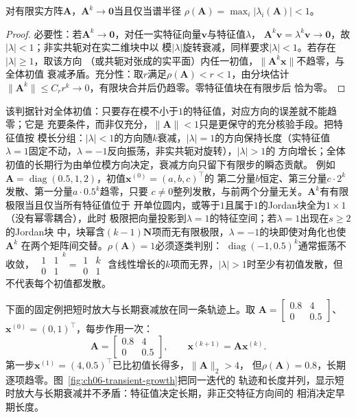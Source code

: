 \begin{theorem}[固定矩阵幂的衰减判据]
\label{thm:ls-power-decay}
对有限实方阵$\bm A$，$\bm A^k\to\bm0$当且仅当谱半径
$\rho(\bm A)=\max_i|\lambda_i(\bm A)|<1$。
\end{theorem}
\begin{proof}
必要性：若$\bm A^k\to\bm0$，对任一实特征向量$\bm v$与特征值$\lambda$，
$\bm A^k\bm v=\lambda^k\bm v\to\bm0$，故$|\lambda|<1$；非实共轭对在实二维块中以
模$|\lambda|$旋转衰减，同样要求$|\lambda|<1$。若存在$|\lambda|\geq1$，取该方向
（或共轭对张成的实平面）内任一初值，$\lVert\bm A^k\bm x\rVert$不趋零，与全体初值
衰减矛盾。充分性：取$r$满足$\rho(\bm A)<r<1$，由分块估计
$\lVert\bm A^k\rVert\leq C_r r^k\to0$，有限块合并后仍趋零。零特征值块在有限步后
恰为零。
\end{proof}
该判据针对全体初值：只要存在模不小于$1$的特征值，对应方向的误差就不能趋零；它是
充要条件，而非仅充分，$\lVert\bm A\rVert<1$只是更保守的充分核验手段。把特征值按
模长分组：$|\lambda|<1$的方向随$k$衰减，$|\lambda|=1$的方向保持长度（实特征值
$\lambda=1$固定不动，$\lambda=-1$反向振荡，非实共轭对旋转），$|\lambda|>1$的
方向增长；全体初值的长期行为由单位模方向决定，衰减方向只留下有限步的瞬态贡献。
例如$\bm A=\operatorname{diag}(0.5,1,2)$，初值$\bm x^{(0)}=(a,b,c)^{\top}$的
第二分量$b$恒定、第三分量$c\cdot2^k$发散、第一分量$a\cdot0.5^k$趋零，只要
$c\neq0$整列发散，与前两个分量无关。$\bm A^k$有有限极限当且仅当所有特征值位于
开单位圆内，或等于$1$且属于$1$的Jordan块全为$1\times1$（没有幂零耦合），此时
极限把向量投影到$\lambda=1$的特征空间；若$\lambda=1$出现在$s\geq2$的Jordan块
中，块幂含$(k-1)\bm N$项而无有限极限，$\lambda=-1$的块即使对角化也使$\bm A^k$
在两个矩阵间交替。$\rho(\bm A)=1$必须逐类判别：
$\operatorname{diag}(-1,0.5)^k$通常振荡不收敛，
$\begin{smallmatrix}1&1\\0&1\end{smallmatrix}^k=\begin{smallmatrix}1&k\\0&1\end{smallmatrix}$
含线性增长的$k$项而无界，$|\lambda|>1$时至少有初值发散，但不代表每个初值都发散。

下面的固定例把短时放大与长期衰减放在同一条轨迹上。取
$\bm A=\begin{bmatrix}0.8&4\\0&0.5\end{bmatrix}$、
$\bm x^{(0)}=(0,1)^{\top}$，每步作用一次：
\begin{equation}
 \bm A=\begin{bmatrix}0.8&4\\0&0.5\end{bmatrix},\qquad
 \bm x^{(k+1)}=\bm A\bm x^{(k)}.
 \label{eq:ch06-fixed-iteration-example}
\end{equation}
第一步$\bm x^{(1)}=(4,0.5)^{\top}$已比初值长得多，$\lVert\bm A\rVert_2>4$，
但$\rho(\bm A)=0.8$，长期逐项趋零。图~\ref{fig:ch06-transient-growth}把同一迭代的
轨迹和长度并列，显示短时放大与长期衰减并不矛盾：特征值决定长期，非正交特征方向间的
相消决定早期长度。


